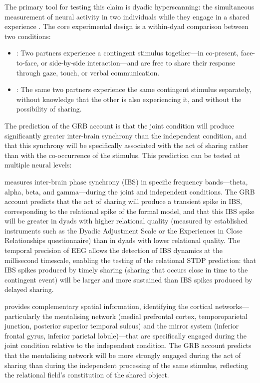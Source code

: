 \noindent
The primary tool for testing this claim is dyadic hyperscanning: the simultaneous measurement of neural activity in two individuals while they engage in a shared experience \parencite{hasson2012,dikker2017}. The core experimental design is a within-dyad comparison between two conditions:

\begin{itemize}
\item {}: Two partners experience a contingent stimulus together---in co-present, face-to-face, or side-by-side interaction---and are free to share their response through gaze, touch, or verbal communication.
\item {}: The same two partners experience the same contingent stimulus separately, without knowledge that the other is also experiencing it, and without the possibility of sharing.
\end{itemize}

The prediction of the GRB account is that the joint condition will produce significantly greater inter-brain synchrony than the independent condition, and that this synchrony will be specifically associated with the act of sharing rather than with the co-occurrence of the stimulus. This prediction can be tested at multiple neural levels:

 measures inter-brain phase synchrony (IBS) in specific frequency bands---theta, alpha, beta, and gamma---during the joint and independent conditions. The GRB account predicts that the act of sharing will produce a transient spike in IBS, corresponding to the relational spike of the formal model, and that this IBS spike will be greater in dyads with higher relational quality (measured by established instruments such as the Dyadic Adjustment Scale or the Experiences in Close Relationships questionnaire) than in dyads with lower relational quality. The temporal precision of EEG allows the detection of IBS dynamics at the millisecond timescale, enabling the testing of the relational STDP prediction: that IBS spikes produced by timely sharing (sharing that occurs close in time to the contingent event) will be larger and more sustained than IBS spikes produced by delayed sharing.

 provides complementary spatial information, identifying the cortical networks---particularly the mentalising network (medial prefrontal cortex, temporoparietal junction, posterior superior temporal sulcus) and the mirror system (inferior frontal gyrus, inferior parietal lobule)---that are specifically engaged during the joint condition relative to the independent condition. The GRB account predicts that the mentalising network will be more strongly engaged during the act of sharing than during the independent processing of the same stimulus, reflecting the relational field's constitution of the shared object.

